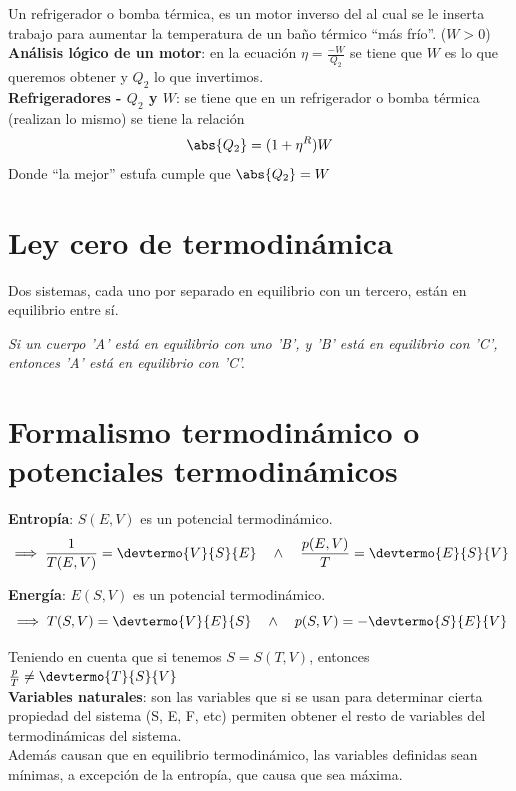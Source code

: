 Un refrigerador o bomba térmica, es un motor inverso del al cual se le inserta trabajo para aumentar la temperatura de un baño térmico \enquote{más frío}. ($W >0$)\\

\textbf{Análisis lógico de un motor}:\label{plbr-motor}
en la ecuación $\eta = \frac{-W}{Q_2}$ se tiene que $W$ es lo que queremos obtener y $Q_2$ lo que invertimos.\\

\textbf{Refrigeradores - $Q_2$ y $W$}:
\label{refri-q2-w}
se tiene que en un refrigerador o bomba térmica (realizan lo mismo) se tiene la relación
\[\abs{Q_2} = (1 + \eta^R)W\]
Donde \enquote{la mejor} estufa cumple que $\abs{Q_2} = W$

\section{Ley cero de termodinámica}

Dos sistemas, cada uno por separado en equilibrio con un tercero, están en equilibrio entre sí.

\textit{Si un cuerpo ’A’ está en equilibrio con uno ’B’, y ’B’ está en equilibrio con ’C’, entonces ’A’ está en equilibrio con ’C’.}

\section{Formalismo termodinámico o potenciales termodinámicos}

\textbf{Entropía}: $S(E, V)$ es un potencial termodinámico.
\[\implies \frac{1}{T(E,V)} = \devtermo{V}{S}{E} \quad 
\land \quad \frac{p(E,V)}{T} = \devtermo{E}{S}{V}\]

\textbf{Energía}: $E(S,V)$ es un potencial termodinámico.
\[\implies T(S,V) = \devtermo{V}{E}{S} \quad \land \quad p(S,V) = -\devtermo{S}{E}{V}\]

Teniendo en cuenta que si tenemos $S = S(T, V)$, entonces $\frac{p}{T} \neq \devtermo{T}{S}{V}$\\

\textbf{Variables naturales}: son las variables que si se usan para determinar cierta propiedad del sistema (S, E, F, etc) permiten obtener el resto de variables del termodinámicas del sistema.\\

Además causan que en equilibrio termodinámico, las variables definidas sean mínimas, a excepción de la entropía, que causa que sea máxima.\\

